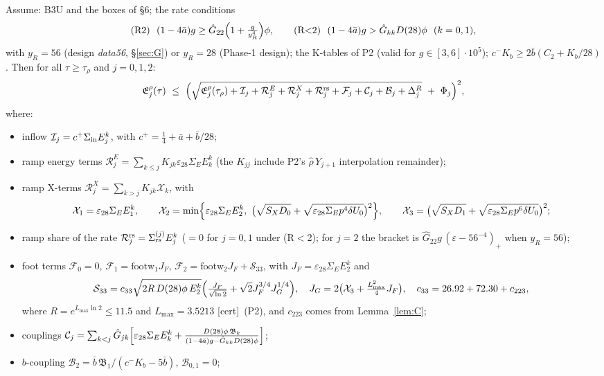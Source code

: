 \documentclass[11pt]{article}
\theoremstyle{remark}\newtheorem{remark}[theorem]{Remark}
\newcommand{\fn}[1]{\texttt{\detokenize{#1}}}
\newcommand{\tC}{\textup{[cert]}}\newcommand{\tE}{\textup{[est]}}\newcommand{\tP}{\textup{[paper]}}\newcommand{\tR}{\textup{[rev]}}
\newcommand{\E}{\mathfrak E}\newcommand{\B}{\mathfrak B}
\begin{document}
\begin{proposition}\label{prop:U}
Assume: B3U and the boxes of \fn{launch_lemma.tex} \S6; the rate conditions
\[
\text{(R2)}\ \ (1-4\bar a)g\ge\hat G_{22}\Bigl(1+\tfrac g{y_R^4}\Bigr)\phi,\qquad\text{(R$<$2)}\ \ (1-4\bar a)g>\hat G_{kk}D(28)\phi\ \ (k=0,1),
\]
with $y_R=56$ (design \emph{data56}, \S\ref{sec:G}) or $y_R=28$ (Phase-1 design); the K-tables of P2 (valid for $g\in[3,6]\cdot10^5$); $c^-K_b\ge2\bar b(C_2+K_b/28)$. Then for all $\tau\ge\tau_\rho$ and $j=0,1,2$:
\[
\E_j^\rho(\tau)\ \le\ \Bigl(\sqrt{\E_j^\rho(\tau_\rho)+\mathcal I_j+\mathcal R^E_j+\mathcal R^X_j+\mathcal R^{\rm rs}_j+\mathcal F_j+\mathcal C_j+\mathcal B_j+\Delta^R_j}\ +\ \Phi_j\Bigr)^2 ,
\]
where:
\begin{itemize}[leftmargin=*,itemsep=1pt]
\item inflow $\mathcal I_j=c^+\Sigma_{\rm in}E^k_j$, with $c^+=\frac14+\bar a+\bar b/28$;
\item ramp energy terms $\mathcal R^E_j=\sum_{k\le j}K_{jk}\varepsilon_{28}\Sigma_EE^k_k$ (the $K_{jj}$ include P2's $\hat\rho\,Y_{j+1}$ interpolation remainder);
\item ramp X-terms $\mathcal R^X_j=\sum_{k>j}K_{jk}\mathcal X_k$, with
\[
\mathcal X_1=\varepsilon_{28}\Sigma_EE^k_1,\qquad
\mathcal X_2=\min\Bigl\{\varepsilon_{28}\Sigma_EE^k_2,\ \bigl(\sqrt{S_XD_0}+\sqrt{\varepsilon_{28}\Sigma_Ep^4\delta U_0}\bigr)^2\Bigr\},\qquad
\mathcal X_3=\bigl(\sqrt{S_XD_1}+\sqrt{\varepsilon_{28}\Sigma_Ep^6\delta U_0}\bigr)^2 ;
\]
\item ramp share of the rate $\mathcal R^{\rm rs}_j=\Sigma^{(j)}_{\rm rs}E^k_j$ ($=0$ for $j=0,1$ under (R$<$2); for $j=2$ the bracket is $\hat G_{22}g\,(\varepsilon-56^{-4})_+$ when $y_R=56$);
\item foot terms $\mathcal F_0=0$, $\mathcal F_1=\mathrm{footw}_1J_F$, $\mathcal F_2=\mathrm{footw}_2J_F+\mathcal S_{33}$, with $J_F=\varepsilon_{28}\Sigma_EE^k_2$ and
\[
\mathcal S_{33}=c_{33}\sqrt{2R\,D(28)\phi\,E^k_2}\Bigl(\tfrac{J_F}{\sqrt{\ln2}}+\sqrt2J_F^{3/4}J_G^{1/4}\Bigr),\quad J_G=2\bigl(\mathcal X_3+\tfrac{L_{\max}^2}4J_F\bigr),\quad c_{33}=26.92+72.30+c_{223},
\]
where $R=e^{L_{\max}\ln2}\le11.5$ and $L_{\max}=3.5213$ \tC\ (P2), and $c_{223}$ comes from Lemma~\ref{lem:C};
\item couplings $\mathcal C_j=\sum_{k<j}\hat G_{jk}\Bigl[\varepsilon_{28}\Sigma_EE^k_k+\frac{D(28)\phi\,\B_k}{(1-4\bar a)g-\hat G_{kk}D(28)\phi}\Bigr]$;
\item $b$-coupling $\mathcal B_2=\bar b\,\B_1/(c^-K_b-5\bar b)$, $\mathcal B_{0,1}=0$;

\end{itemize}
\end{proposition}
\end{document}
